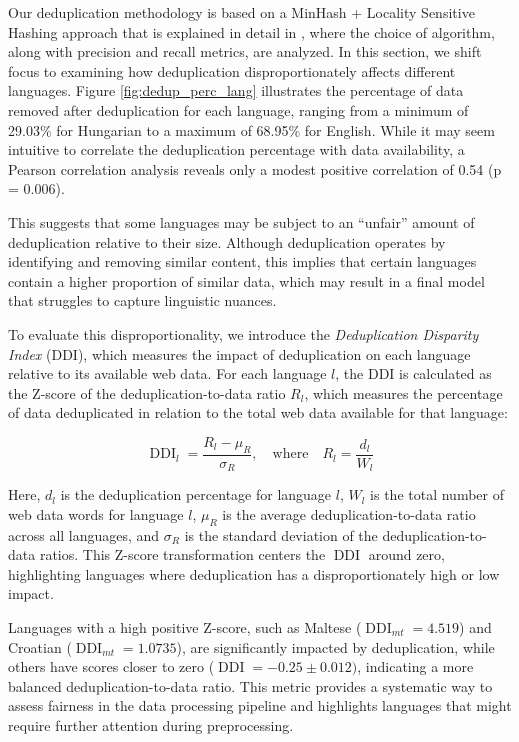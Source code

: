 Our deduplication methodology is based on a MinHash + Locality Sensitive Hashing approach that is explained in detail in \cite{leveling_helmer_etal2024}, where the choice of algorithm, along with precision and recall metrics, are analyzed. 
In this section, we shift focus to examining how deduplication disproportionately affects different languages. Figure \ref{fig:dedup_perc_lang} illustrates the percentage of data removed after deduplication for each language, ranging from a minimum of 29.03\% for Hungarian to a maximum of 68.95\% for English. While it may seem intuitive to correlate the deduplication percentage with data availability, a Pearson correlation analysis reveals only a modest positive correlation of 0.54 (p = 0.006).

This suggests that some languages may be subject to an ``unfair'' amount of deduplication relative to their size. Although deduplication operates by identifying and removing similar content, this implies that certain languages contain a higher proportion of similar data, which may result in a final model that struggles to capture linguistic nuances.


To evaluate this disproportionality, we introduce the \textit{Deduplication Disparity Index} (DDI), which measures the impact of deduplication on each language relative to its available web data. For each language \( l \), the DDI is calculated as the Z-score of the deduplication-to-data ratio \( R_l \), which measures the percentage of data deduplicated in relation to the total web data available for that language:


\[
\operatorname{DDI}_l = \frac{R_l - \mu_R}{\sigma_R}, \quad \text{where} \quad R_l = \frac{d_l}{W_l}
\]



Here, \( d_l \) is the deduplication percentage for language \( l \), \( W_l \) is the total number of web data words for language \( l \), \( \mu_R \) is the average deduplication-to-data ratio across all languages, and \( \sigma_R \) is the standard deviation of the deduplication-to-data ratios. This Z-score transformation centers the $\operatorname{DDI}$ around zero, highlighting languages where deduplication has a disproportionately high or low impact.

Languages with a high positive Z-score, such as Maltese ($\operatorname{DDI}_{mt}=4.519$) and Croatian ($\operatorname{DDI}_{mt}=1.0735$), are significantly impacted by deduplication, while others have scores closer to zero ($\operatorname{DDI} = -0.25 \pm 0.012)$, indicating a more balanced deduplication-to-data ratio. This metric provides a systematic way to assess fairness in the data processing pipeline and highlights languages that might require further attention during preprocessing.

